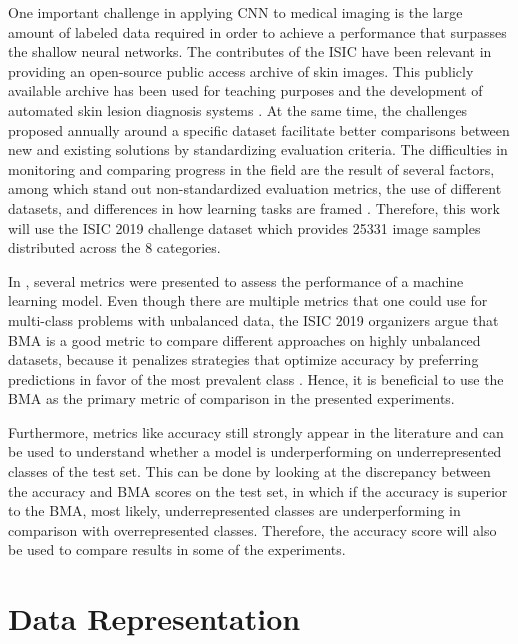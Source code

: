     One important challenge in applying \ac{CNN} to medical imaging is the large amount of labeled data required in order to achieve a performance that surpasses the shallow neural networks. The contributes of the \ac{ISIC} have been relevant in providing an open-source public access archive of skin images. This publicly available archive has been used for teaching purposes and the development of automated skin lesion diagnosis systems \cite{isic2019}. At the same time, the challenges proposed annually around a specific dataset facilitate better comparisons between new and existing solutions by standardizing evaluation criteria. The difficulties in monitoring and comparing progress in the field are the result of several factors, among which stand out non-standardized evaluation metrics, the use of different datasets, and differences in how learning tasks are framed \cite{Brinker2018}. Therefore, this work will use the \ac{ISIC} 2019 challenge dataset which provides 25331 image samples distributed across the 8 categories. \par
    
    In , several metrics were presented to assess the performance of a machine learning model. Even though there are multiple metrics that one could use for multi-class problems with unbalanced data, the \ac{ISIC} 2019 organizers argue that \ac{BMA} is a good metric to compare different approaches on highly unbalanced datasets, because it penalizes strategies that optimize accuracy by preferring predictions in favor of the most prevalent class \cite{humanvsisic2018}. Hence, it is beneficial to use the \ac{BMA} as the primary metric of comparison in the presented experiments. \par 
    
    Furthermore, metrics like accuracy still strongly appear in the literature and can be used to understand whether a model is underperforming on underrepresented classes of the test set. This can be done by looking at the discrepancy between the accuracy and \ac{BMA} scores on the test set, in which if the accuracy is superior to the \ac{BMA}, most likely, underrepresented classes are underperforming in comparison with overrepresented classes. Therefore, the accuracy score will also be used to compare results in some of the experiments. \par 

\section{Data Representation}
\label{section:data}
    

